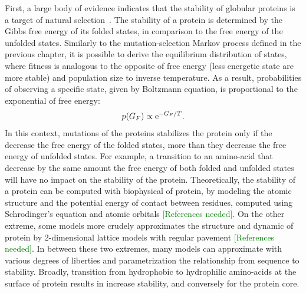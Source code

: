 First, a large body of evidence indicates that the stability of globular proteins is a target of natural selection~\citep{Sikosek2014}.
The stability of a protein is determined by the Gibbs free energy of its folded states, in comparison to the free energy of the unfolded states.
Similarly to the mutation-selection Markov process defined in the previous chapter, it is possible to derive the equilibrium distribution of states, where fitness is analogous to the opposite of free energy (less energetic state are more stable) and population size to inverse temperature.
As a result, probabilities of observing a specific state, given by Boltzmann equation, is proportional to the exponential of free energy:
\begin{align}
	p(G_F)\propto \mathrm{e}^{- G_F / T}.
\end{align}
In this context, mutations of the proteins stabilizes the protein only if the decrease the free energy of the folded states, more than they decrease the free energy of unfolded states.
For example, a {transition} to an amino-acid that decrease by the same amount the free energy of both folded and unfolded states will have no impact on the stability of the protein.
Theoretically, the stability of a protein can be computed with biophysical of protein, by modeling the atomic structure and the potential energy of contact between residues, computed using Schrodinger's equation and atomic orbitals \textcolor{GREEN}{[References needed]}.
On the other extreme, some models more crudely approximates the structure and dynamic of protein by 2-dimensional lattice models with regular pavement \textcolor{GREEN}{[References needed]}. 
In between these two extremes, many models can approximate with various degrees of liberties and parametrization the relationship from sequence to stability.
Broadly, {transition} from hydrophobic to hydrophilic amino-acids at the surface of protein results in increase stability, and conversely for the protein core.

